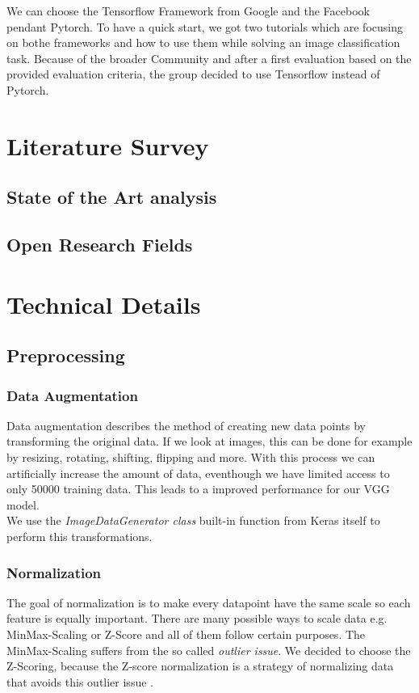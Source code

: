 \documentclass[journal]{IEEEtran}
\begin{document}
\noindent We can choose the Tensorflow Framework from Google and the Facebook pendant Pytorch. To have a quick start, we got two tutorials which are focusing on bothe frameworks and how to use them while solving an image classification task. Because of the broader Community and after a first evaluation based on the provided evaluation criteria, the group decided to use Tensorflow instead of Pytorch.
\section{Literature Survey}
\subsection{State of the Art analysis}
\subsection{Open Research Fields}
%
%
\section{Technical Details}
\subsection{Preprocessing}
\subsubsection{Data Augmentation}
Data augmentation describes the method of creating new data points by transforming the original data. If we look at images, this can be done for example by resizing, rotating, shifting, flipping and more.
With this process we can artificially increase the amount of data, eventhough we have limited access to only 50000 training data. 
This leads to a improved performance for our VGG model. \\
We use the \textit{ImageDataGenerator class} built-in function from Keras itself to perform this transformations.

\subsubsection{Normalization}
The goal of normalization is to make every datapoint have the same scale so each feature is equally important. There are many possible ways to scale data e.g. MinMax-Scaling or Z-Score and all of them follow certain purposes. 
The MinMax-Scaling suffers from the so called \textit{outlier issue}.
We decided to choose the Z-Scoring, because the Z-score normalization is a strategy of normalizing data that avoids this outlier issue \cite{RN6}.  
\end{document}

